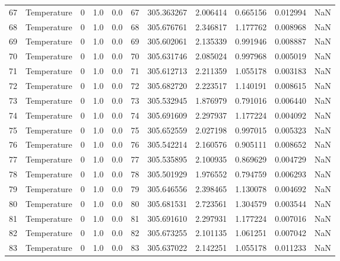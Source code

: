 \begin{tabular}{llrrrrrrrrr}
67  &  Temperature &       0 &  1.0 &  0.0 &   67 &  305.363267 &  2.006414 &  0.665156 &   0.012994 &      NaN \\
68  &  Temperature &       0 &  1.0 &  0.0 &   68 &  305.676761 &  2.346817 &  1.177762 &   0.008968 &      NaN \\
69  &  Temperature &       0 &  1.0 &  0.0 &   69 &  305.602061 &  2.135339 &  0.991946 &   0.008887 &      NaN \\
70  &  Temperature &       0 &  1.0 &  0.0 &   70 &  305.631746 &  2.085024 &  0.997968 &   0.005019 &      NaN \\
71  &  Temperature &       0 &  1.0 &  0.0 &   71 &  305.612713 &  2.211359 &  1.055178 &   0.003183 &      NaN \\
72  &  Temperature &       0 &  1.0 &  0.0 &   72 &  305.682720 &  2.223517 &  1.140191 &   0.008615 &      NaN \\
73  &  Temperature &       0 &  1.0 &  0.0 &   73 &  305.532945 &  1.876979 &  0.791016 &   0.006440 &      NaN \\
74  &  Temperature &       0 &  1.0 &  0.0 &   74 &  305.691609 &  2.297937 &  1.177224 &   0.004092 &      NaN \\
75  &  Temperature &       0 &  1.0 &  0.0 &   75 &  305.652559 &  2.027198 &  0.997015 &   0.005323 &      NaN \\
76  &  Temperature &       0 &  1.0 &  0.0 &   76 &  305.542214 &  2.160576 &  0.905111 &   0.008652 &      NaN \\
77  &  Temperature &       0 &  1.0 &  0.0 &   77 &  305.535895 &  2.100935 &  0.869629 &   0.004729 &      NaN \\
78  &  Temperature &       0 &  1.0 &  0.0 &   78 &  305.501929 &  1.976552 &  0.794759 &   0.006293 &      NaN \\
79  &  Temperature &       0 &  1.0 &  0.0 &   79 &  305.646556 &  2.398465 &  1.130078 &   0.004692 &      NaN \\
80  &  Temperature &       0 &  1.0 &  0.0 &   80 &  305.681531 &  2.723561 &  1.304579 &   0.003544 &      NaN \\
81  &  Temperature &       0 &  1.0 &  0.0 &   81 &  305.691610 &  2.297931 &  1.177224 &   0.007016 &      NaN \\
82  &  Temperature &       0 &  1.0 &  0.0 &   82 &  305.673255 &  2.101135 &  1.061251 &   0.007042 &      NaN \\
83  &  Temperature &       0 &  1.0 &  0.0 &   83 &  305.637022 &  2.142251 &  1.055178 &   0.011233 &      NaN \\

\end{tabular}
